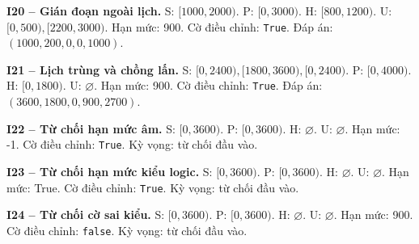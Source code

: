 \noindent\textbf{I20 -- Gián đoạn ngoài lịch.}
S: $[1000,2000)$.
P: $[0,3000)$.
H: $[800,1200)$.
U: $[0,500), [2200,3000)$.
Hạn mức: 900. Cờ điều chỉnh: \texttt{True}. Đáp án: $(1000, 200, 0, 0, 1000)$.

\noindent\textbf{I21 -- Lịch trùng và chồng lấn.}
S: $[0,2400), [1800,3600), [0,2400)$.
P: $[0,4000)$.
H: $[0,1800)$.
U: $\varnothing$.
Hạn mức: 900. Cờ điều chỉnh: \texttt{True}. Đáp án: $(3600, 1800, 0, 900, 2700)$.

\noindent\textbf{I22 -- Từ chối hạn mức âm.}
S: $[0,3600)$.
P: $[0,3600)$.
H: $\varnothing$.
U: $\varnothing$.
Hạn mức: -1. Cờ điều chỉnh: \texttt{True}. Kỳ vọng: từ chối đầu vào.

\noindent\textbf{I23 -- Từ chối hạn mức kiểu logic.}
S: $[0,3600)$.
P: $[0,3600)$.
H: $\varnothing$.
U: $\varnothing$.
Hạn mức: True. Cờ điều chỉnh: \texttt{True}. Kỳ vọng: từ chối đầu vào.

\noindent\textbf{I24 -- Từ chối cờ sai kiểu.}
S: $[0,3600)$.
P: $[0,3600)$.
H: $\varnothing$.
U: $\varnothing$.
Hạn mức: 900. Cờ điều chỉnh: \texttt{false}. Kỳ vọng: từ chối đầu vào.


